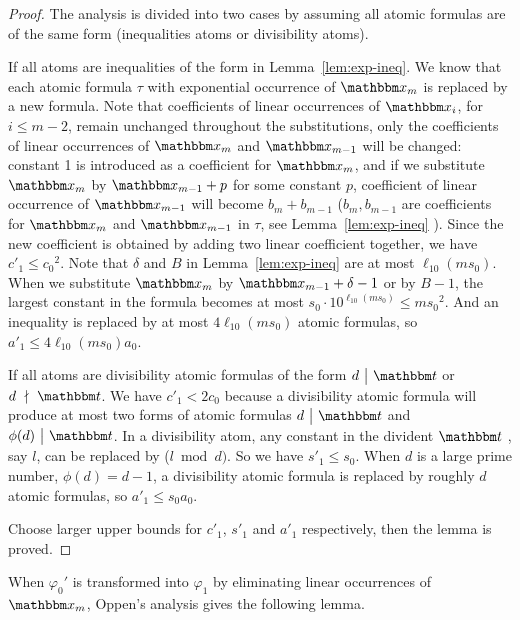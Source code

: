 \begin{proof}
The analysis is divided into two cases by assuming all atomic formulas are of the same form (inequalities atoms or divisibility atoms). 

If all atoms are inequalities of the form in Lemma~\ref{lem:exp-ineq}. We know that each atomic formula $\tau$ with exponential occurrence of $\ivarx_m$ is replaced by a new formula. Note that coefficients of linear occurrences of $\ivarx_i$, for $i\le m-2$, remain unchanged throughout the substitutions, only the coefficients of linear occurrences of $\ivarx_m$ and $\ivarx_{m-1}$ will be changed: constant 1 is introduced as a coefficient for $\ivarx_m$, and if we substitute $\ivarx_m$ by $\ivarx_{m-1}+p$ for some constant $p$, coefficient of linear occurrence of $\ivarx_{m-1}$ will become $b_m+b_{m-1}$ ($b_m,b_{m-1}$ are coefficients for $\ivarx_{m}$ and $\ivarx_{m-1}$ in $\tau$, see Lemma~\ref{lem:exp-ineq} ). Since the new coefficient is obtained by adding two linear coefficient together, we have $c'_1\le {c_0}^2$. Note that $\delta$ and $B$ in Lemma~\ref{lem:exp-ineq} are at most $\ell_{10}(ms_0)$. When we substitute $\ivarx_m$ by $\ivarx_{m-1}+\delta-1$ or by $B-1$, the largest constant in the formula becomes at most $s_0\cdot  10^{\ell_{10}(ms_0)}\le m{s_0}^2$. And an inequality is replaced by at most $4\ell_{10}(ms_0)$ atomic formulas, so $a'_1\le 4\ell_{10}(ms_0)a_0$.

If all atoms are divisibility atomic formulas of the form $d \ \big \vert  \ \iterm$ or $d \ \nmid \ \iterm$. We have $c'_1<2c_0$ because a divisibility atomic formula  will produce at most two forms of atomic formulas $d \ \big \vert  \ \iterm$ and $\phi(d) \ \big \vert  \ \iterm$. In a divisibility atom, any constant in the divident $\iterm$ , say $l$, can be replaced by ($l \bmod d)$. So we have $s'_1\le s_0$. When $d$ is a large prime number, $\phi(d)=d-1$, a divisibility atomic formula is replaced by roughly $d$ atomic formulas, so $a'_1\le s_0a_0$. 

Choose larger upper bounds for $c'_1$, $s'_1$ and $a'_1$ respectively, then the lemma is proved.\end{proof}

When $\varphi_0'$ is transformed into $\varphi_{1}$ by eliminating linear occurrences of $\ivarx_m$, Oppen's analysis gives the following lemma.


